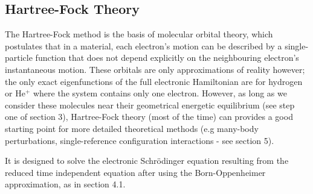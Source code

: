 \documentclass[10pt]{article}
\begin{document}
\subsection{Hartree-Fock Theory}
The Hartree-Fock method is the basis of molecular orbital theory, which postulates that in a material, each electron's motion can be described by a single-particle function that does not depend explicitly on the neighbouring electron's instantaneous motion. These orbitals are only approximations of reality however; the only exact eigenfunctions of the full electronic Hamiltonian are for hydrogen or He$^+$ where the system contains only one electron. However, as long as we consider these molecules near their geometrical energetic equilibrium (see step one of section 3), Hartree-Fock theory (most of the time) can provides a good starting point for more detailed theoretical methods (e.g many-body perturbations, single-reference configuration interactions - see section 5). 

It is designed to solve the electronic Schrödinger equation resulting from the reduced time independent equation after using the Born-Oppenheimer approximation, as in section 4.1. %



\end{document}
